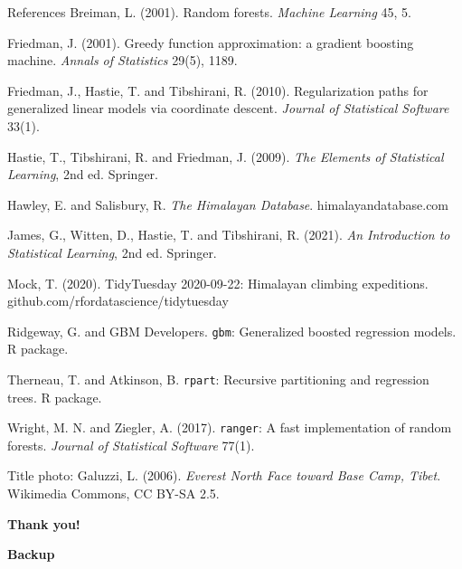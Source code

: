 \documentclass[aspectratio=169,10pt,t]{beamer}
\begin{document}
\begin{frame}{References}
\scriptsize
\setlength{\parskip}{0.4em}
Breiman, L. (2001). Random forests. \textit{Machine Learning} 45, 5.

Friedman, J. (2001). Greedy function approximation: a gradient boosting machine. \textit{Annals of Statistics} 29(5), 1189.

Friedman, J., Hastie, T. and Tibshirani, R. (2010). Regularization paths for generalized linear models via coordinate descent. \textit{Journal of Statistical Software} 33(1).

Hastie, T., Tibshirani, R. and Friedman, J. (2009). \textit{The Elements of Statistical Learning}, 2nd ed. Springer.

Hawley, E. and Salisbury, R. \textit{The Himalayan Database}. himalayandatabase.com

James, G., Witten, D., Hastie, T. and Tibshirani, R. (2021). \textit{An Introduction to Statistical Learning}, 2nd ed. Springer.

Mock, T. (2020). TidyTuesday 2020-09-22: Himalayan climbing expeditions. github.com/rfordatascience/tidytuesday

Ridgeway, G. and GBM Developers. \texttt{gbm}: Generalized boosted regression models. R package.

Therneau, T. and Atkinson, B. \texttt{rpart}: Recursive partitioning and regression trees. R package.

Wright, M. N. and Ziegler, A. (2017). \texttt{ranger}: A fast implementation of random forests. \textit{Journal of Statistical Software} 77(1).

Title photo: Galuzzi, L. (2006). \textit{Everest North Face toward Base Camp, Tibet}. Wikimedia Commons, CC BY-SA 2.5.
\end{frame}

\begin{frame}
\vfill
\centering
{\Large\bfseries\color{navy} Thank you!\par}
\vfill
\end{frame}

\appendix
\begin{frame}
\vfill
\centering
{\Large\bfseries\color{navy} Backup\par}
\vfill
\end{frame}
\end{document}
